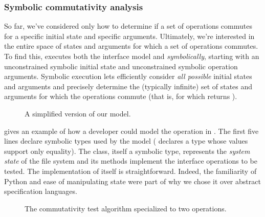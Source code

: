 \subsubsection{Symbolic commutativity analysis}
\label{sec:topic:rename-conditions}

So far, we've considered only how to determine if a set of operations
commutes for a specific initial state and specific arguments.
Ultimately, we're interested in the entire space of states and
arguments for which a set of operations commutes.  To find this,
\analyzer executes both the interface model and 
\emph{symbolically}, starting with an
unconstrained symbolic initial state and unconstrained symbolic
operation arguments.  Symbolic execution lets \analyzer efficiently
consider \emph{all possible} initial states and arguments and
precisely determine the (typically infinite) set of states and arguments
for which the operations commute (that is, for which 
returns ).

\begin{figure}
  \caption{A simplified version of our  model.}
  \label{fig:rename-spec}
\end{figure}

 gives an example of how a developer could model
the  operation in \analyzer.  The first five lines
declare symbolic types used by the model (
declares a type whose values support only equality).  The 
class, itself a symbolic type, represents the \emph{system state} of
the file system and its methods implement the interface operations to
be tested.  The implementation of  itself is
straightforward.  Indeed, the familiarity of Python and ease of
manipulating state were part of why we chose it over abstract
specification languages.

\begin{figure}
  \caption{The \SIM commutativity test algorithm specialized to two
    operations.}
  \label{fig:commutes2}
\end{figure}

